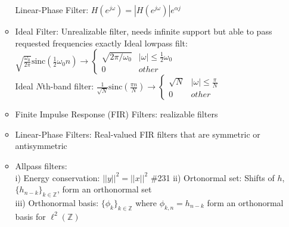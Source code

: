 \documentclass{article}
\newcommand{\cg}{\color{gray}}
\newcommand{\fs}{\footnotesize}
\begin{document}
\begin{itemize}
\begin{itemize}
{{Linear-Phase Filter: $H(e^{j\omega})=|H(e^{j\omega})|e^{\alpha j}$ }
}
\item Ideal Filter: {\cg Unrealizable filter, needs infinite support but able to pass requested frequencies exactly}
{\cg\fs Ideal lowpass filt: $\sqrt{\frac{\omega_0}{2\pi}}\text{sinc}(\frac{1}{2}\omega_0 n) \rightarrow \begin{cases}\sqrt{2\pi/\omega_0} & |\omega|\le \frac{1}{2}\omega_0 \\ 0 & other\end{cases}$ \\
Ideal $N$th-band filter: $\frac{1}{\sqrt{N}}\text{sinc}(\frac{\pi n}{N}) \rightarrow \begin{cases}\sqrt{N} & |\omega|\le \frac{\pi}{N} \\ 0 & other\end{cases}$
}
\item Finite Impulse Response (FIR) Filters: {\cg realizable filters} \\
\item Linear-Phase Filters: {\cg Real-valued FIR filters that are symmetric or antisymmetric}
\item Allpass filters: \\
{\cg \fs
i) Energy conservation: $||y||^2=||x||^2$ \#231
ii) Ortonormal set: Shifts of $h$, $\{h_{n-k}\}_{k\in\mathbb{Z}}$, form an orthonormal set\\
iii) Orthonormal basis: $\{\phi_k\}_{k\in\mathbb{Z}}$ where $\phi_{k,n}=h_{n-k}$ form an orthonormal basis for $\ell^2(\mathbb{Z})$}


\end{itemize}
\end{itemize}
\end{document}
